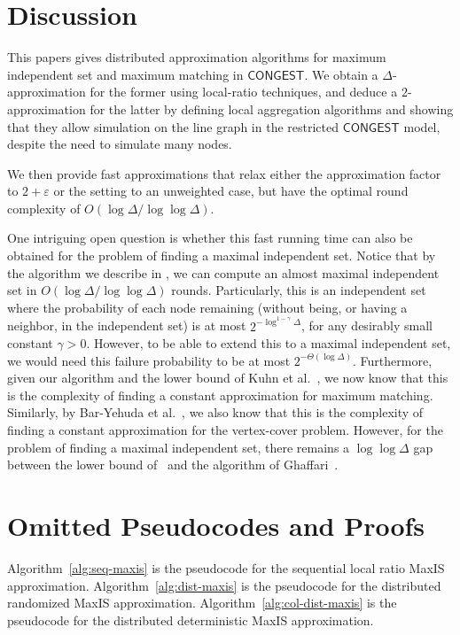 \documentclass[11pt]{article}
\newcommand{\eps}{\varepsilon}
\begin{document}
\section{Discussion}
\label{sec:discussion}
This papers gives distributed approximation algorithms for maximum independent set and maximum matching in $\mathsf{CONGEST}$. We obtain a $\Delta$-approximation for the former using local-ratio techniques, and deduce a $2$-approximation for the latter by defining local aggregation algorithms and showing that they allow simulation on the line graph in the restricted $\mathsf{CONGEST}$ model, despite the need to simulate many nodes.

We then provide fast approximations that relax either the approximation factor to $2+\eps$ or the setting to an unweighted case, but have the optimal round complexity of $O(\log\Delta/\log\log\Delta)$.

One intriguing open question is whether this fast running time can also be obtained for the problem of finding a maximal independent set. Notice that by the algorithm we describe in , we can compute an almost maximal independent set in $O(\log\Delta/\log\log\Delta)$ rounds. Particularly, this is an independent set where the probability of each node remaining (without being, or having a neighbor, in the independent set) is at most $2^{-\log^{1-\gamma}\Delta}$, for any desirably small constant $\gamma>0$. However, to be able to extend this to a maximal independent set, we would need this failure probability to be at most $2^{-\Theta(\log\Delta)}$. Furthermore, given our algorithm and the lower bound of Kuhn et al.~\cite{kuhn2006price}, we now know that this is the complexity of finding a constant approximation for maximum matching. Similarly, by Bar-Yehuda et al.~\cite{bar2016distributed}, we also know that this is the complexity of finding a constant approximation for the vertex-cover problem. However, for the problem of finding a maximal independent set, there remains a $\log\log\Delta$ gap between the lower bound of~\cite{kuhn2006price} and the algorithm of Ghaffari~\cite{Ghaffari2016}.



\appendix
\newpage
\section{Omitted Pseudocodes and Proofs}

Algorithm~\ref{alg:seq-maxis} is the pseudocode for the sequential local ratio MaxIS approximation.
\SeqAlgMaxIS
Algorithm~\ref{alg:dist-maxis} is the pseudocode for the distributed randomized MaxIS approximation.
\DistAlgMaxIS
Algorithm~\ref{alg:col-dist-maxis} is the pseudocode for the distributed deterministic MaxIS approximation.
\DistAlgColor
\end{document}
